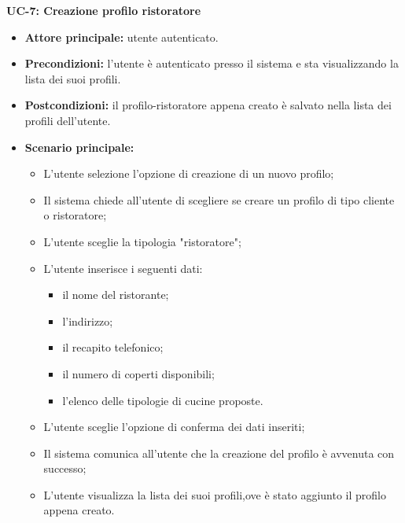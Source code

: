 \textbf{UC-7: Creazione profilo ristoratore}
\begin{itemize}
    \item \textbf{Attore principale:} utente autenticato.
    \item \textbf{Precondizioni:} l'utente è autenticato presso il sistema e sta visualizzando la lista dei suoi profili.
    \item \textbf{Postcondizioni:} il profilo-ristoratore appena creato è salvato nella lista dei profili dell'utente.
    \item \textbf{Scenario principale:}
    \begin{itemize}
        \item L'utente selezione l'opzione di creazione di un nuovo profilo;
        \item Il sistema chiede all'utente di scegliere se creare un profilo di tipo cliente
        o ristoratore;
        \item L'utente sceglie la tipologia "ristoratore";
        \item L'utente inserisce i seguenti dati:
        \begin{itemize}
            \item il nome del ristorante;
            \item l'indirizzo;
            \item il recapito telefonico;
            \item il numero di coperti disponibili;
            \item l'elenco delle tipologie di cucine proposte.
        \end{itemize}
        \item L'utente sceglie l'opzione di conferma dei dati inseriti;
        \item Il sistema comunica all'utente che la creazione del profilo è avvenuta con successo;
        \item L'utente visualizza la lista dei suoi profili,ove è stato aggiunto il profilo appena creato.
    \end{itemize}
\end{itemize}

